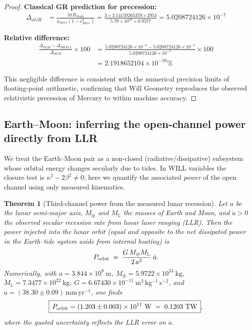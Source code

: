 \documentclass[12pt, a4paper]{article}
\newtheorem{theorem}{Theorem}[section]
\begin{document}
\begin{proof}
\textbf{Classical GR prediction for precession:}
\begin{align}
Δ _{\phi GR} &= \frac{3\pi R_{Ssun}}{a_{Merc} (1 - e_{Merc}^{2})} = \frac{3 \times 3.14159265359 \times 2953}{5.79 \times 10^{10} \times 0.9577} = 5.0208724126 \times 10^{-7}
\end{align}

\textbf{Relative difference:}
\begin{align}
\frac{Δ _{\phi GR}-Δ _{\phi WILL}}{Δ _{\phi GR}} \times 100 &= \frac{5.0208724126 \times 10^{-7} - 5.0208724126 \times 10^{-7}}{5.0208724126 \times 10^{-7}} \times 100 \\
&= 2.1918652104 \times 10^{-10} \%
\end{align}

This negligible difference is consistent with the numerical precision limits of floating-point arithmetic, confirming that Will Geometry reproduces the observed relativistic precession of Mercury to within machine accuracy.

\end{proof}

\subsection{Earth--Moon: inferring the open-channel power directly from LLR}

We treat the Earth--Moon pair as a non-closed (radiative/dissipative) subsystem whose orbital energy changes secularly due to tides. In WILL variables the closure test is $\kappa^2-2\beta^2\neq0$; here we quantify the associated \emph{power} of the open channel using only measured kinematics.

\begin{theorem}[Third-channel power from the measured lunar recession]
Let $a$ be the lunar semi-major axis, $M_\oplus$ and $M_\mathbb{L}$ the masses of Earth and Moon, and $\dot a>0$ the observed secular recession rate from lunar laser ranging (LLR). Then the power injected into the lunar orbit (equal and opposite to the net dissipated power in the Earth--tide system aside from internal heating) is
\[
P_{\rm orbit}\;=\; \frac{G\,M_\oplus M_\mathbb{L}}{2\,a^{2}}\;\dot a.
\]
Numerically, with $a=3.844\times10^{8}\ \mathrm{m}$, $M_\oplus=5.9722\times10^{24}\ \mathrm{kg}$, $M_\mathbb{L}=7.3477\times10^{22}\ \mathrm{kg}$, $G=6.67430\times10^{-11}\ \mathrm{m^3\,kg^{-1}\,s^{-2}}$, and $\dot a=(38.30\pm0.09)\ \mathrm{mm\,yr^{-1}}$, one finds
\[
\boxed{\,P_{\rm orbit} = (1.203\pm0.003)\times10^{11}\ {\rm W}\;=\;0.1203\ {\rm TW}\,},
\]
where the quoted uncertainty reflects the LLR error on $\dot a$.
\end{theorem}
\end{document}
